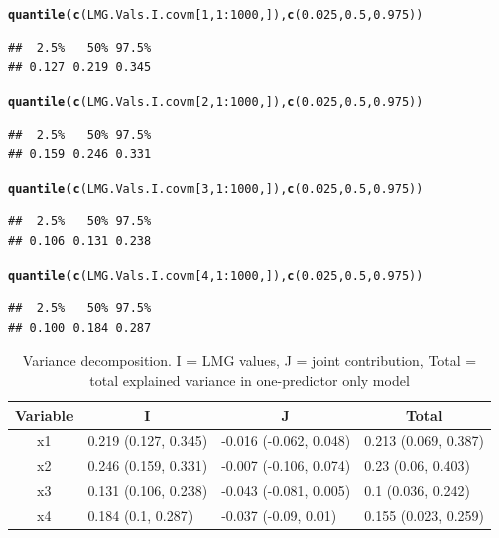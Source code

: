 \documentclass[11pt,a4paper,twoside]{book}
\makeatletter
\newcommand{\hlnum}[1]{\textcolor[rgb]{0.686,0.059,0.569}{#1}}%
\newcommand{\hlopt}[1]{\textcolor[rgb]{0,0,0}{#1}}%
\newcommand{\hlstd}[1]{\textcolor[rgb]{0.345,0.345,0.345}{#1}}%
\newcommand{\hlkwd}[1]{\textcolor[rgb]{0.737,0.353,0.396}{\textbf{#1}}}%
\newenvironment{kframe}{%
 \def\at@end@of@kframe{}%
 \ifinner\ifhmode%
  \def\at@end@of@kframe{\end{minipage}}%
  \begin{minipage}{\columnwidth}%
 \fi\fi%
 \def\FrameCommand##1{\hskip\@totalleftmargin \hskip-\fboxsep
 \colorbox{shadecolor}{##1}\hskip-\fboxsep
     \hskip-\linewidth \hskip-\@totalleftmargin \hskip\columnwidth}%
 \MakeFramed {\advance\hsize-\width
   \@totalleftmargin\z@ \linewidth\hsize
   \@setminipage}}%
 {\par\unskip\endMakeFramed%
 \at@end@of@kframe}
\newenvironment{knitrout}{}{} %
\makeatother
\begin{document}
\begin{knitrout}
\begin{kframe}
\begin{alltt}
\hlkwd{quantile}\hlstd{(}\hlkwd{c}\hlstd{(LMG.Vals.I.covm[}\hlnum{1}\hlstd{,}\hlnum{1}\hlopt{:}\hlnum{1000}\hlstd{,]),} \hlkwd{c}\hlstd{(}\hlnum{0.025}\hlstd{,} \hlnum{0.5}\hlstd{,} \hlnum{0.975}\hlstd{))}
\end{alltt}
\begin{verbatim}
##  2.5%   50% 97.5% 
## 0.127 0.219 0.345
\end{verbatim}
\begin{alltt}
\hlkwd{quantile}\hlstd{(}\hlkwd{c}\hlstd{(LMG.Vals.I.covm[}\hlnum{2}\hlstd{,}\hlnum{1}\hlopt{:}\hlnum{1000}\hlstd{,]),} \hlkwd{c}\hlstd{(}\hlnum{0.025}\hlstd{,} \hlnum{0.5}\hlstd{,} \hlnum{0.975}\hlstd{))}
\end{alltt}
\begin{verbatim}
##  2.5%   50% 97.5% 
## 0.159 0.246 0.331
\end{verbatim}
\begin{alltt}
\hlkwd{quantile}\hlstd{(}\hlkwd{c}\hlstd{(LMG.Vals.I.covm[}\hlnum{3}\hlstd{,}\hlnum{1}\hlopt{:}\hlnum{1000}\hlstd{,]),} \hlkwd{c}\hlstd{(}\hlnum{0.025}\hlstd{,} \hlnum{0.5}\hlstd{,} \hlnum{0.975}\hlstd{))}
\end{alltt}
\begin{verbatim}
##  2.5%   50% 97.5% 
## 0.106 0.131 0.238
\end{verbatim}
\begin{alltt}
\hlkwd{quantile}\hlstd{(}\hlkwd{c}\hlstd{(LMG.Vals.I.covm[}\hlnum{4}\hlstd{,}\hlnum{1}\hlopt{:}\hlnum{1000}\hlstd{,]),} \hlkwd{c}\hlstd{(}\hlnum{0.025}\hlstd{,} \hlnum{0.5}\hlstd{,} \hlnum{0.975}\hlstd{))}
\end{alltt}
\begin{verbatim}
##  2.5%   50% 97.5% 
## 0.100 0.184 0.287
\end{verbatim}
\end{kframe}
\end{knitrout}


\begin{table}[h]
\centering
\begin{tabular}{clll}
  \hline
  \multicolumn{1}{c}{\textbf{Variable}} & \multicolumn{1}{c}{\textbf{I}} &\multicolumn{1}{c}{\textbf{J}} & \multicolumn{1}{c}{\textbf{Total}} \\
  \hline
x1 & 0.219 (0.127, 0.345)  & -0.016 (-0.062, 0.048)   & 0.213 (0.069, 0.387)  \\ 
x2 & 0.246 (0.159, 0.331)  & -0.007 (-0.106, 0.074)   & 0.23 (0.06, 0.403)  \\ 
x3 & 0.131 (0.106, 0.238)  & -0.043 (-0.081, 0.005)   & 0.1 (0.036, 0.242)  \\ 
x4 & 0.184 (0.1, 0.287)  & -0.037 (-0.09, 0.01)   & 0.155 (0.023, 0.259)  \\ 

   \hline
\end{tabular}
\caption{Variance decomposition. I = LMG values, J = joint contribution, Total = total explained variance in one-predictor only model}
\label{tbl:fundus.to.SLO3}
\end{table}
\end{document}
